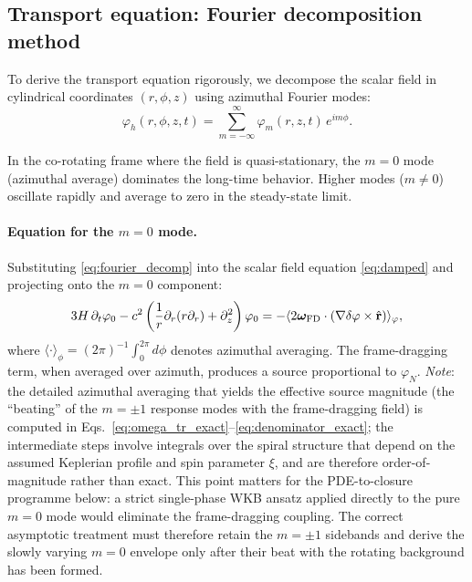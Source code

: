 \documentclass[11pt]{article}
\begin{document}
\subsection{Transport equation: Fourier decomposition method}

To derive the transport equation rigorously, we decompose the scalar field in cylindrical coordinates $(r, \phi, z)$ using azimuthal Fourier modes:
\begin{equation}
\varphi_h(r, \phi, z, t) = \sum_{m=-\infty}^{\infty} \varphi_m(r, z, t) \, e^{im\phi}.
\label{eq:fourier_decomp}
\end{equation}

In the co-rotating frame where the field is quasi-stationary, the $m=0$ mode (azimuthal average) dominates the long-time behavior. Higher modes ($m \neq 0$) oscillate rapidly and average to zero in the steady-state limit.

\paragraph{Equation for the $m=0$ mode.}
Substituting \eqref{eq:fourier_decomp} into the scalar field equation \eqref{eq:damped} and projecting onto the $m=0$ component:
\begin{equation}
3H\,\partial_t \varphi_0 - c^2\left(\frac{1}{r}\partial_r(r\partial_r) + \partial_z^2\right)\varphi_0 = -\langle 2\bm{\omega}_{\rm FD}\cdot(\nabla\delta\varphi\times\hat{\mathbf{r}}) \rangle_\varphi,
\label{eq:m0_equation}
\end{equation}
where $\langle \cdot \rangle_\phi = (2\pi)^{-1}\int_0^{2\pi} d\phi$ denotes azimuthal averaging. The frame-dragging term, when averaged over azimuth, produces a source proportional to $\varphi_N$.  \emph{Note}: the detailed azimuthal averaging that yields the effective source magnitude (the ``beating'' of the $m=\pm1$ response modes with the frame-dragging field) is computed in Eqs.~\eqref{eq:omega_tr_exact}--\eqref{eq:denominator_exact}; the intermediate steps involve integrals over the spiral structure that depend on the assumed Keplerian profile and spin parameter $\xi$, and are therefore order-of-magnitude rather than exact.
This point matters for the PDE-to-closure programme below: a strict
single-phase WKB ansatz applied directly to the pure $m=0$ mode would
eliminate the frame-dragging coupling.  The correct asymptotic treatment
must therefore retain the $m=\pm1$ sidebands and derive the slowly varying
$m=0$ envelope only after their beat with the rotating background has been
formed.
\end{document}
